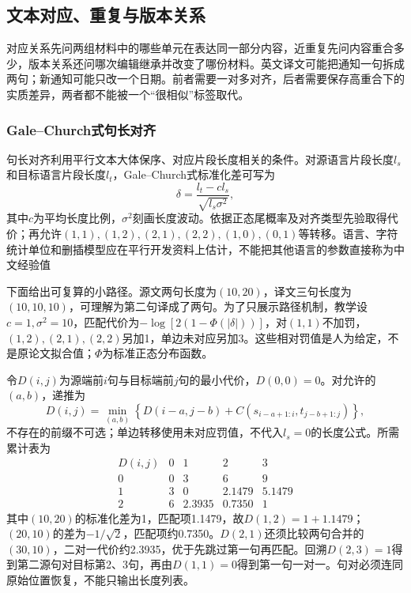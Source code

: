\subsection{文本对应、重复与版本关系}
\label{sec:nlp-classification-alignment-duplicates}

对应关系先问两组材料中的哪些单元在表达同一部分内容，近重复先问内容重合多少，版本关系还问哪次编辑继承并改变了哪份材料。英文译文可能把通知一句拆成两句；新通知可能只改一个日期。前者需要一对多对齐，后者需要保存高重合下的实质差异，两者都不能被一个“很相似”标签取代。

\subsubsection{Gale--Church式句长对齐}
\label{sec:nlp-classification-galechurch}

句长对齐利用平行文本大体保序、对应片段长度相关的条件。对源语言片段长度$l_s$和目标语言片段长度$l_t$，Gale--Church式标准化差可写为
\[
  \delta=\frac{l_t-c l_s}{\sqrt{l_s\sigma^2}},
\]
其中$c$为平均长度比例，$\sigma^2$刻画长度波动。依据正态尾概率及对齐类型先验取得代价；再允许$(1,1),(1,2),(2,1),(2,2),(1,0),(0,1)$等转移。语言、字符统计单位和删插模型应在平行开发资料上估计，不能把其他语言的参数直接称为中文经验值

下面给出可复算的小路径。源文两句长度为$(10,20)$，译文三句长度为$(10,10,10)$，可理解为第二句译成了两句。为了只展示路径机制，教学设$c=1,\sigma^2=10$，匹配代价为$-\log[2(1-\Phi(|\delta|))]$，对$(1,1)$不加罚，$(1,2),(2,1),(2,2)$另加1，单边未对应另加3。这些相对罚值是人为给定，不是原论文拟合值；$\Phi$为标准正态分布函数。

令$D(i,j)$为源端前$i$句与目标端前$j$句的最小代价，$D(0,0)=0$。对允许的$(a,b)$，递推为
\[
 D(i,j)=\min_{(a,b)}
 \left\{D(i-a,j-b)+C(s_{i-a+1:i},t_{j-b+1:j})\right\},
\]
不存在的前缀不可选；单边转移使用未对应罚值，不代入$l_s=0$的长度公式。所需累计表为
\[
 \begin{array}{c|rrrr}
 D(i,j)&0&1&2&3\\ \hline
 0&0&3&6&9\\
 1&3&0&2.1479&5.1479\\
 2&6&2.3935&0.7350&1
 \end{array}
\]
其中$(10,20)$的标准化差为1，匹配项1.1479，故$D(1,2)=1+1.1479$；$(20,10)$的差为$-1/\sqrt2$，匹配项约0.7350。$D(2,1)$还须比较两句合并的$(30,10)$，二对一代价约2.3935，优于先跳过第一句再匹配。回溯$D(2,3)=1$得到第二源句对目标第2、3句，再由$D(1,1)=0$得到第一句一对一。句对必须连同原始位置恢复，不能只输出长度列表。

